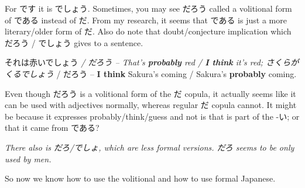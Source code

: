 {}

For です it is でしょう. Sometimes, you may see だろう called a volitional form of である instead of だ. From my research, it seems that である is just a more literary/older form of だ.\crlf
Also do note that doubt/conjecture implication which だろう / でしょう gives to a sentence.

それは赤いでしょう {\em / だろう -- That's {\bf probably} red / {\bf I think} it's red; さくらがくるでしょう }/ だろう -- {\bf I think} Sakura's coming / Sakura's {\bf probably} coming.

Even though だろう is a volitional form of the だ copula, it actually seems like it can be used with adjectives normally, whereas regular だ copula cannot. It might be because it expresses probably/think/guess and not is that is part of the -い; or that it came from である?

{\em There also is だろ/でしょ, which are less formal versions. だろ seems to be only used by men.}

So now we know how to use the volitional and how to use formal Japanese.

{}

\stopsectionlevel

\stopsectionlevel
